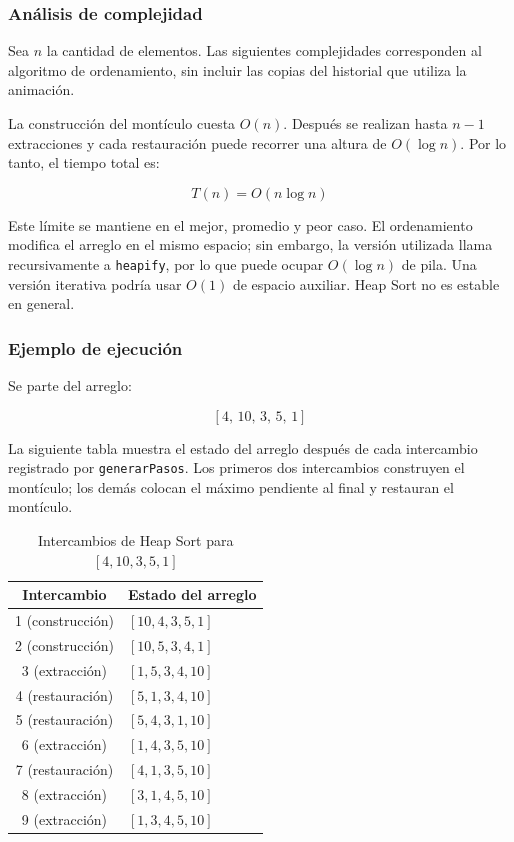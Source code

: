 \documentclass[11pt,letterpaper]{article}
\begin{document}
\subsubsection{Análisis de complejidad}

Sea \(n\) la cantidad de elementos. Las siguientes complejidades corresponden al algoritmo de ordenamiento, sin incluir las copias del historial que utiliza la animación.

La construcción del montículo cuesta \(O(n)\). Después se realizan hasta \(n-1\) extracciones y cada restauración puede recorrer una altura de \(O(\log n)\). Por lo tanto, el tiempo total es:

\[
T(n)=O(n\log n)
\]

Este límite se mantiene en el mejor, promedio y peor caso. El ordenamiento modifica el arreglo en el mismo espacio; sin embargo, la versión utilizada llama recursivamente a \texttt{heapify}, por lo que puede ocupar \(O(\log n)\) de pila. Una versión iterativa podría usar \(O(1)\) de espacio auxiliar. Heap Sort no es estable en general.

\subsubsection{Ejemplo de ejecución}

Se parte del arreglo:

\[
[4,\,10,\,3,\,5,\,1]
\]

La siguiente tabla muestra el estado del arreglo después de cada intercambio registrado por \texttt{generar\-Pasos}. Los primeros dos intercambios construyen el montículo; los demás colocan el máximo pendiente al final y restauran el montículo.

\begin{table}[H]
\centering
\caption{Intercambios de Heap Sort para \([4,10,3,5,1]\)}
\begin{tabular}{cl}
\toprule
\textbf{Intercambio} & \textbf{Estado del arreglo} \\
\midrule
1 (construcción) & \([10,4,3,5,1]\) \\
2 (construcción) & \([10,5,3,4,1]\) \\
3 (extracción) & \([1,5,3,4,10]\) \\
4 (restauración) & \([5,1,3,4,10]\) \\
5 (restauración) & \([5,4,3,1,10]\) \\
6 (extracción) & \([1,4,3,5,10]\) \\
7 (restauración) & \([4,1,3,5,10]\) \\
8 (extracción) & \([3,1,4,5,10]\) \\
9 (extracción) & \([1,3,4,5,10]\) \\
\bottomrule
\end{tabular}
\end{table}
\end{document}
